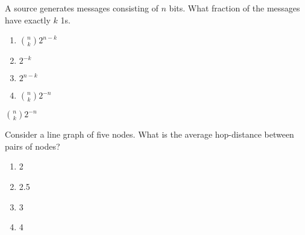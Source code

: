 \documentclass[a4 paper]{article}
\begin{document}
A source generates messages consisting of $n$ bits. What fraction of the messages have exactly $k$ 1s.
\begin{enumerate}
	\item ${n\choose k} 2^{n-k}$
	\item $2^{-k}$
	\item $2^{n-k}$
	\item ${n\choose k} 2^{-n}$
\end{enumerate}
\solution ${n\choose k} 2^{-n}$

Consider a line graph of five nodes. What is the average hop-distance between pairs of nodes?
\begin{enumerate}
	\item 2
	\item 2.5
	\item 3
	\item 4
\end{enumerate}
\end{document}
